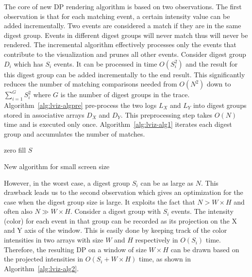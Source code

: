 The core of new DP rendering algorithm is based on two observations.
The first observation is that for each matching event,
a certain intensity value can be added incrementally.
Two events are considered a match if they are in the same digest group.
Events in different digest groups will never match thus will never be rendered.
The incremental algorithm effectively processes only the events
that contribute to the visualization and prunes all other events.
Consider digest group $D_i$ which has $S_i$ events.
It can be processed in time $O(S_i^2)$
and the result for this digest group can be added incrementally to the 
end result.
This significantly reduces the number of matching comparisons needed
from $O(N^2)$ down to $\sum_{i=1}^{G} S_i^2$
where $G$ is the number of digest groups in the trace.
Algorithm~\ref{alg:lviz-algpre} pre-process the two logs $L_X$ and $L_Y$
into digest groups stored in associative arrays $D_X$ and $D_Y$.
This preprocessing step takes $O(N)$ time and is executed only once.
Algorithm~\ref{alg:lviz-alg1} iterates each digest group and accumulates
the number of matches.

\begin{algorithm}[htb]
\BlankLine
zero fill $S$\;
\caption{New algorithm for small screen size}
\label{alg:lviz-alg2}
\end{algorithm}

However, in the worst case, a digest group $S_i$ can be as large as $N$.
This drawback leads us to the second observation which
gives an optimization for the case when the digest group size is large.
It exploits the fact that $N > W\times H$ and often also $N \gg W\times H$.
Consider a digest group with $S_i$ events.
The intensity (color) for each event in that group can be recorded as
its projection on the X and Y axis of the window.
This is easily done by keeping track of the color intensities in
two arrays with size $W$ and $H$ respectively in $O(S_i)$ time.
Therefore, the resulting DP on a window of size $W \times H$
can be drawn based on the projected intensities in $O(S_i + W\times H)$ time,
as shown in Algorithm~\ref{alg:lviz-alg2}.

